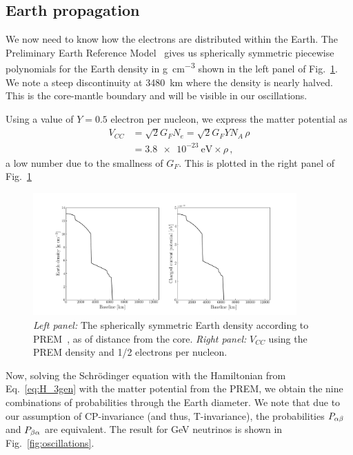 \subsection{Earth propagation}
We now need to know how the electrons are distributed within the Earth. The Preliminary Earth Reference Model~\cite{PREM} gives us spherically
symmetric piecewise polynomials for the Earth density in \si{\gram\cm^{-3}} shown in the left panel of Fig.~\ref{fig:potential}.
We note a steep discontinuity at \SI{3480}{\km} where the density is nearly halved. This is the core-mantle boundary and will be visible in our 
oscillations.

Using a value of $Y=0.5$ electron per nucleon, we express the matter potential as
\begin{align}
    V_{CC} &= \sqrt{2}G_F N_e = \sqrt{2}G_F Y N_A \,\rho \nonumber \\
           &= \SI{3.8e-23}{\eV} \times \rho\,,
\end{align}
a low number due to the smallness of $G_F$. This is plotted in the right panel of Fig.~\ref{fig:potential}
\begin{figure}
    \centering
    \includegraphics[width=0.9\textwidth]{figures/potential.pdf}
    \caption{\emph{Left panel:} The spherically symmetric Earth density according to PREM~\cite{PREM}, as of distance from the core.
    \emph{Right panel:} $V_{CC}$ using the PREM density and 1/2 electrons per nucleon.}\label{fig:potential}
\end{figure}

Now, solving the Schrödinger equation with the Hamiltonian from Eq.~\ref{eq:H_3gen} with the matter potential from the PREM,
we obtain the nine combinations of probabilities through the Earth diameter. We note that due to our assumption of CP-invariance
(and thus, T-invariance), the probabilities $P_{\alpha\beta}$ and $P_{\beta\alpha}$ are equivalent. The result for \si{\GeV} neutrinos 
is shown in Fig.~\ref{fig:oscillations}.

